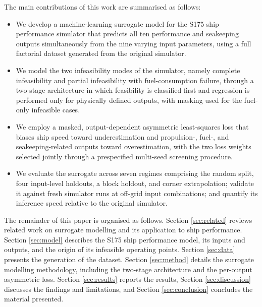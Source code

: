 \documentclass[final,5p,times,twocolumn,numbers]{elsarticle}
\begin{document}
The main contributions of this work are summarised as follows:
\begin{itemize}
\item We develop a machine-learning surrogate model for the S175 ship performance simulator that predicts all ten performance and seakeeping outputs simultaneously from the nine varying input parameters, using a full factorial dataset generated from the original simulator.

\item We model the two infeasibility modes of the simulator, namely complete infeasibility and partial infeasibility with fuel-consumption failure, through a two-stage architecture in which feasibility is classified first and regression is performed only for physically defined outputs, with masking used for the fuel-only infeasible cases.

\item We employ a masked, output-dependent asymmetric least-squares loss that biases ship speed toward underestimation and propulsion-, fuel-, and seakeeping-related outputs toward overestimation, with the two loss weights selected jointly through a prespecified multi-seed screening procedure.

\item We evaluate the surrogate across seven regimes comprising the random split, four input-level holdouts, a block holdout, and corner extrapolation; validate it against fresh simulator runs at off-grid input combinations; and quantify its inference speed relative to the original simulator.

\end{itemize}
The remainder of this paper is organised as follows. Section \ref{sec:related} reviews related work on surrogate modelling and its application to ship performance. Section \ref{sec:model} describes the S175 ship performance model, its inputs and outputs, and the origin of its infeasible operating points. Section \ref{sec:data} presents the generation of the dataset. Section \ref{sec:method} details the surrogate modelling methodology, including the two-stage architecture and the per-output asymmetric loss. Section \ref{sec:results} reports the results, Section \ref{sec:discussion} discusses the findings and limitations, and Section \ref{sec:conclusion} concludes the material presented.

\end{document}
